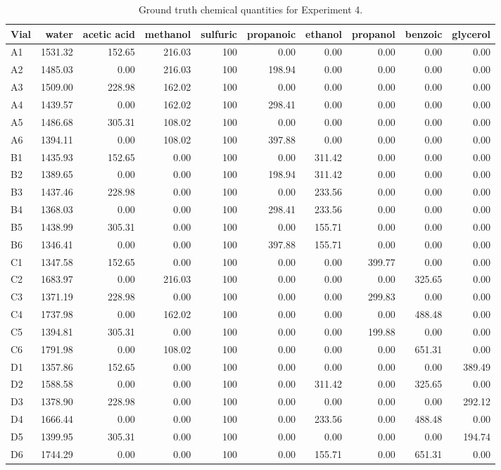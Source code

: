 \documentclass[sn-nature, twocolumn]{sn-jnl}%
\theoremstyle{thmstyleone}%
\theoremstyle{thmstyletwo}%
\theoremstyle{thmstylethree}%
\begin{document}
\begin{table}[!htb]
    \scriptsize
\begin{tabular}{lrrrrrrrrr}
\toprule
Vial & water & acetic acid & methanol & sulfuric & propanoic & ethanol & propanol & benzoic & glycerol \\
\midrule
A1 & 1531.32 & 152.65 & 216.03 & 100 & 0.00 & 0.00 & 0.00 & 0.00 & 0.00 \\
A2 & 1485.03 & 0.00 & 216.03 & 100 & 198.94 & 0.00 & 0.00 & 0.00 & 0.00 \\
A3 & 1509.00 & 228.98 & 162.02 & 100 & 0.00 & 0.00 & 0.00 & 0.00 & 0.00 \\
A4 & 1439.57 & 0.00 & 162.02 & 100 & 298.41 & 0.00 & 0.00 & 0.00 & 0.00 \\
A5 & 1486.68 & 305.31 & 108.02 & 100 & 0.00 & 0.00 & 0.00 & 0.00 & 0.00 \\
A6 & 1394.11 & 0.00 & 108.02 & 100 & 397.88 & 0.00 & 0.00 & 0.00 & 0.00 \\
B1 & 1435.93 & 152.65 & 0.00 & 100 & 0.00 & 311.42 & 0.00 & 0.00 & 0.00 \\
B2 & 1389.65 & 0.00 & 0.00 & 100 & 198.94 & 311.42 & 0.00 & 0.00 & 0.00 \\
B3 & 1437.46 & 228.98 & 0.00 & 100 & 0.00 & 233.56 & 0.00 & 0.00 & 0.00 \\
B4 & 1368.03 & 0.00 & 0.00 & 100 & 298.41 & 233.56 & 0.00 & 0.00 & 0.00 \\
B5 & 1438.99 & 305.31 & 0.00 & 100 & 0.00 & 155.71 & 0.00 & 0.00 & 0.00 \\
B6 & 1346.41 & 0.00 & 0.00 & 100 & 397.88 & 155.71 & 0.00 & 0.00 & 0.00 \\
C1 & 1347.58 & 152.65 & 0.00 & 100 & 0.00 & 0.00 & 399.77 & 0.00 & 0.00 \\
C2 & 1683.97 & 0.00 & 216.03 & 100 & 0.00 & 0.00 & 0.00 & 325.65 & 0.00 \\
C3 & 1371.19 & 228.98 & 0.00 & 100 & 0.00 & 0.00 & 299.83 & 0.00 & 0.00 \\
C4 & 1737.98 & 0.00 & 162.02 & 100 & 0.00 & 0.00 & 0.00 & 488.48 & 0.00 \\
C5 & 1394.81 & 305.31 & 0.00 & 100 & 0.00 & 0.00 & 199.88 & 0.00 & 0.00 \\
C6 & 1791.98 & 0.00 & 108.02 & 100 & 0.00 & 0.00 & 0.00 & 651.31 & 0.00 \\
D1 & 1357.86 & 152.65 & 0.00 & 100 & 0.00 & 0.00 & 0.00 & 0.00 & 389.49 \\
D2 & 1588.58 & 0.00 & 0.00 & 100 & 0.00 & 311.42 & 0.00 & 325.65 & 0.00 \\
D3 & 1378.90 & 228.98 & 0.00 & 100 & 0.00 & 0.00 & 0.00 & 0.00 & 292.12 \\
D4 & 1666.44 & 0.00 & 0.00 & 100 & 0.00 & 233.56 & 0.00 & 488.48 & 0.00 \\
D5 & 1399.95 & 305.31 & 0.00 & 100 & 0.00 & 0.00 & 0.00 & 0.00 & 194.74 \\
D6 & 1744.29 & 0.00 & 0.00 & 100 & 0.00 & 155.71 & 0.00 & 651.31 & 0.00 \\
\bottomrule
\end{tabular}
    \caption{Ground truth chemical quantities for Experiment 4.}
    \label{tab:placeholder}
\end{table}
\end{document}
